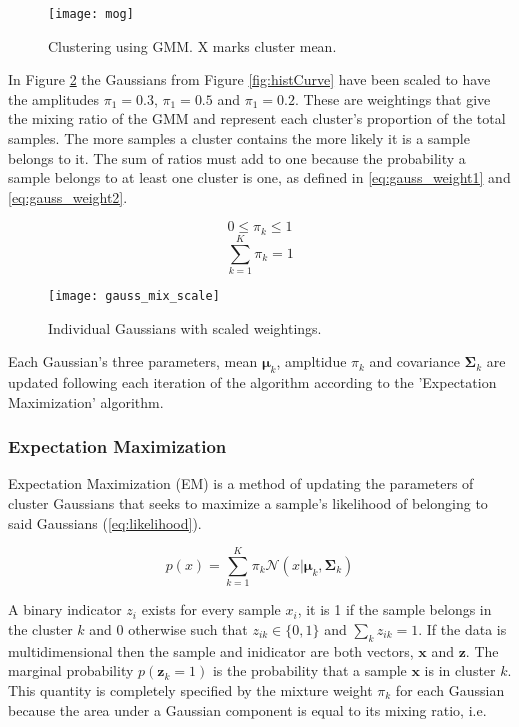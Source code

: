 \begin{figure}[H]
	\centering
	\centering\texttt{[image: mog]}
	\caption{Clustering using GMM. X marks cluster mean.}
	\label{fig:mogcov}
\end{figure}
  
In Figure \ref{fig:histScale} the Gaussians from Figure \ref{fig:histCurve} have been scaled to have the amplitudes $\pi_1 = 0.3$, $\pi_1 = 0.5$ and $\pi_1 = 0.2$. These are weightings that give the mixing ratio of the GMM and represent each cluster's proportion of the total samples. The more samples a cluster contains the more likely it is a sample belongs to it. The sum of ratios must add to one because the probability a sample belongs to at least one cluster is one, as defined in \ref{eq:gauss_weight1} and \ref{eq:gauss_weight2}.

\begin{equation}
    0\leq \pi_k \leq 1
\label{eq:gauss_weight1}
\end{equation}
\begin{equation}
    \sum_{k=1}^{K}\pi_k = 1
\label{eq:gauss_weight2}
\end{equation}


\begin{figure}[H]
    \centering
    \centering\texttt{[image: gauss\_mix\_scale]}
    \caption{Individual Gaussians with scaled weightings.}
    \label{fig:histScale}
  \end{figure} 

Each Gaussian's three parameters, mean $\bm{\mu}_k$, ampltidue $\pi_k$ and covariance $\bm{\Sigma}_k$ are updated following each iteration of the algorithm according to the 'Expectation Maximization' algorithm.

\subsubsection{Expectation Maximization}

Expectation Maximization (EM) is a method of updating the parameters of cluster Gaussians that seeks to maximize a sample's likelihood of belonging to said Gaussians (\ref{eq:likelihood}). 

\begin{equation}
\label{eq:likelihood}
p(x) = \sum^K_{k=1} \pi_k \mathcal{N}(x|\bm{\mu}_k, \bm{\Sigma}_k)
\end{equation}

A binary indicator $z_{i}$ exists for every sample $x_i$, it is 1 if the sample belongs in the cluster $k$ and 0 otherwise such that $z_{ik} \in \{0, 1\}$ and $\sum_k z_{ik} = 1$. If the data is multidimensional then the sample and inidicator are both vectors, $\bm{x}$ and $\bm{z}$. The marginal probability $p(\bm{z}_{k} = 1)$ is the probability that a sample $\bm{x}$ is in cluster $k$. This quantity is completely specified by the mixture weight $\pi_k$ for each Gaussian because the area under a Gaussian component is equal to its mixing ratio, i.e.


